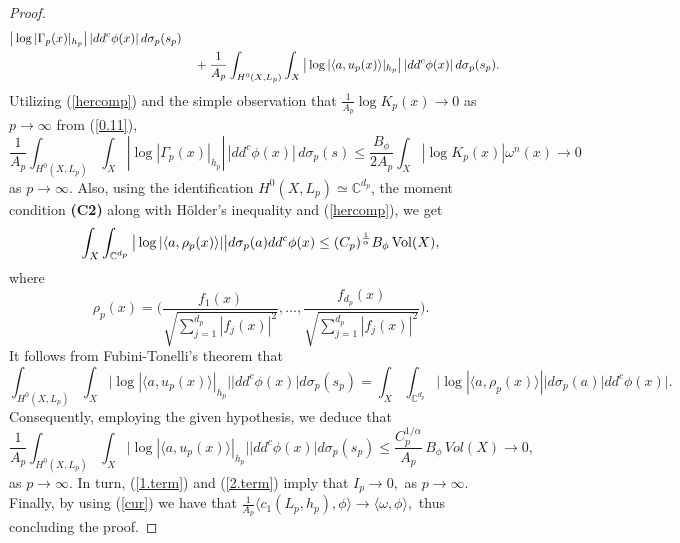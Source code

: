 \documentclass[11pt,leqno,oneside]{amsart}
\numberwithin{equation}{section}
\begin{document}
\begin{proof}
\begin{align}
\big|\log |\Gamma_p(x)|_{h_p}\big|\,|dd^{c}\phi(x)|\,d\sigma_p(s_p) \notag\\
&\quad + \frac{1}{A_p}\int_{H^{0}(X,L_p)}\int_X
\big|\log |\langle a,u_p(x)\rangle|_{h_p}\big|\,|dd^{c}\phi(x)|\,d\sigma_p(s_p).
\end{align} Utilizing (\ref{hercomp}) and the simple observation that $\frac{1}{A_{p}}\log K_{p}(x) \rightarrow 0$ as $p \rightarrow \infty$ from (\ref{0.11}),
	\begin{equation}\label{1.term}
		\frac{1}{A_{p}}\int_{H^{0}(X, L_{p})}\int_{X}|\log{|\Gamma_{p}(x)|_{h_{p}}}|\,|dd^{c}\phi(x)|\,d\sigma_{p}(s) \leq 	\frac{B_{\phi}}{2A_{p}}\int_{X}|\log K_{p}(x)| \omega^{n}(x)\rightarrow 0
	\end{equation} as $p \rightarrow \infty.$ Also, using the identification  $H^{0}(X, L_{p})\simeq\mathbb{C}^{d_{p}}$,  the moment condition \textbf{(C2)} along with  H\"{o}lder's inequality and (\ref{hercomp}),  we get \begin{equation} \int_{X}\int_{\mathbb{C}^{d_{p}}}{\big{|}\log{| \langle a, \rho_{p}(x)\rangle|}\big{|}}d\sigma_{p}(a)dd^{c}\phi(x)\leq (C_{p})^{\frac{1}{\alpha}}B_{\phi}\,\mathrm{Vol}(X),  \end{equation} where $$\rho_{p}(x)=\Big(\frac{f_{1}(x)}{\sqrt{\sum_{j=1}^{d_{p}}{|f_{j}(x)|^{2}}}}, \ldots, \frac{f_{d_{p}}(x)}{\sqrt{\sum_{j=1}^{d_{p}}{|f_{j}(x)|^{2}}}}\Big).$$It follows from Fubini-Tonelli's theorem that \begin{equation*}
	\int_{H^{0}(X, L_{p})}\int_{X}{\big |\log{| \langle a, u_{p}(x)\rangle|_{h_{p}}}\big|}\big |dd^{c}\phi(x)\big|d\sigma_{p}(s_{p})=\int_{X}\int_{\mathbb{C}^{d_{p}}}{\big|\log{| \langle a, \rho_{p}(x)\rangle|}\big|}d\sigma_{p}(a)\big|dd^{c}\phi(x)\big|.
	\end{equation*}Consequently, employing the given hypothesis, we deduce that
	\begin{equation}\label{2.term}
		\frac{1}{A_{p}}  \int_{H^{0}(X, L_{p})}\int_{X}{\big|\log{| \langle a, u_{p}(x)\rangle|_{h_{p}}}\big|}\big|dd^{c}\phi(x)\big|d\sigma_{p}(s_{p})\leq \frac{C_{p}^{1/{\alpha}}}{A_{p}}\,B_{\phi}\,Vol(X) \rightarrow 0,  \end{equation}
		as $p\rightarrow \infty$. In turn, (\ref{1.term}) and (\ref{2.term}) imply that $I_{p}\rightarrow 0,$ as $p \rightarrow \infty.$ Finally, by using (\ref{cur}) we have that $	\frac{1}{A_{p}}\langle c_{1}(L_{p}, h_{p}), \phi \rangle \rightarrow \langle \omega, \phi \rangle ,$ thus concluding the proof.
\end{proof}
\end{document}
